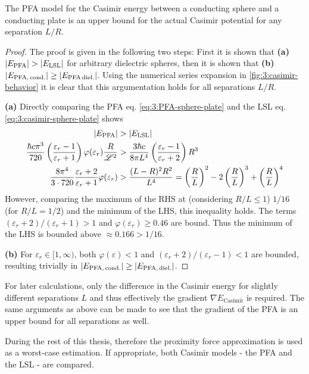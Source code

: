 \begin{theorem}
  The PFA model for the Casimir energy between a conducting sphere and a conducting plate is an upper bound for the actual Casimir potential for any separation $L/R$.
\end{theorem}
\begin{proof}
  The proof is given in the following two steps: First it is shown that \textbf{(a)} $\left\lvert E_\mathrm{PFA}\right\rvert > \left\lvert E_\mathrm{LSL}\right\rvert$ for arbitrary dielectric spheres, then it is shown that \textbf{(b)} $\left\lvert E_\mathrm{PFA,\,cond.}\right\rvert \geq \left\lvert E_\mathrm{PFA\,diel.}\right\rvert$. Using the numerical series expansion in \cref{fig:3:casimir-behavior} it is clear that this argumentation holds for all separations $L/R$.
  
  \textbf{(a)} Directly comparing the PFA eq. \eqref{eq:3:PFA-sphere-plate} and the LSL eq. \eqref{eq:3:casimir-sphere-plate} shows
  \begin{align}
    \left\lvert E_\mathrm{PFA}\right\rvert &> \left\lvert E_\mathrm{LSL}\right\rvert\\
    \frac{\hbar c \pi^3}{720} \left(\frac{\varepsilon_r - 1}{\varepsilon_r + 1}\right)\varphi(\varepsilon_r) \frac{R}{\mathscr{L}^2} &> \frac{3\hbar c}{8 \pi L^4}\left(\frac{\varepsilon_r - 1}{\varepsilon_r + 2}\right) R^3 \\
    \frac{8 \pi^4}{3 \cdot 720} \frac{\varepsilon_r + 2}{\varepsilon_r + 1} \varphi(\varepsilon_r) &> \frac{(L-R)^2 R^2}{L^4} = \left(\frac{R}{L}\right)^2 - 2\left(\frac{R}{L}\right)^3 + \left(\frac{R}{L}\right)^4
  \end{align}
  However, comparing the maximum of the RHS at (considering $R/L \leq 1$) $1/16$ (for $R/L = 1/2$) and the minimum of the LHS, this inequality holds. The terms $(\varepsilon_r + 2)/(\varepsilon_r + 1) > 1$ and $\varphi(\varepsilon_r) \geq 0.46$ are bound. Thus the minimum of the LHS is bounded above $\approx 0.166 > 1/16$.

  \textbf{(b)} For $\varepsilon_r \in [1,\infty)$, both $\varphi(\varepsilon) < 1$ and $(\varepsilon_r + 2)/(\varepsilon_r - 1) < 1$ are bounded, resulting trivially in $\left\lvert E_\mathrm{PFA,\,cond.}\right\rvert \geq \left\lvert E_\mathrm{PFA,\,diel.}\right\rvert$.
\end{proof}
\begin{remark}
  For later calculations, only the difference in the Casimir energy for slightly different separations $L$ and thus effectively the gradient $\nabla E_\mathrm{Casimir}$ is required. The same arguments as above can be made to see that the gradient of the PFA is an upper bound for all separations as well.
\end{remark}
During the rest of this thesis, therefore the proximity force approximation is used as a worst-case estimation. If appropriate, both Casimir models - the PFA and the LSL - are compared.